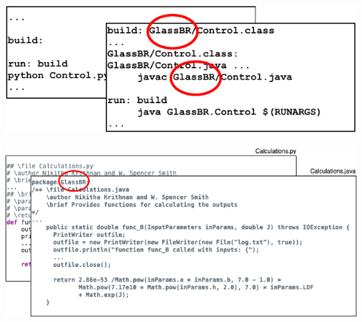\documentclass{beamer}
\begin{document}

\begin{frame}


\includegraphics[width=1.05\textwidth]{../figures/MakefileCircleGlassBR.pdf}

\end{frame}


\begin{frame}


\includegraphics[width=1.05\textwidth]{../figures/CodeCircleGlassBR.png}

\end{frame}

\end{document}
